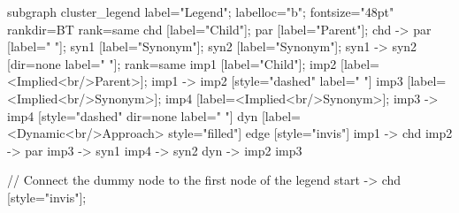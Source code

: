 \documentclass{article}
\begin{document}
{subgraph cluster_legend {
    label="Legend";
    labelloc="b";
    fontsize="48pt"
    rankdir=BT
    {
        rank=same
        chd [label="Child"];
        par [label="Parent"];
        chd -> par [label="                "];
        syn1 [label="Synonym"];
        syn2 [label="Synonym"];
        syn1 -> syn2 [dir=none label="                "];
    }
    {
        rank=same
        imp1 [label="Child"];
        imp2 [label=<Implied<br/>Parent>];
        imp1 -> imp2 [style="dashed" label="                "]
        imp3 [label=<Implied<br/>Synonym>];
        imp4 [label=<Implied<br/>Synonym>];
        imp3 -> imp4 [style="dashed" dir=none label="                "]
    }
        dyn [label=<Dynamic<br/>Approach> style="filled"]
    edge [style="invis"]
    imp1 -> chd
    imp2 -> par
    imp3 -> syn1
    imp4 -> syn2
dyn -> { imp2 imp3 }
}

// Connect the dummy node to the first node of the legend
start -> chd [style="invis"];
}
\end{document}

